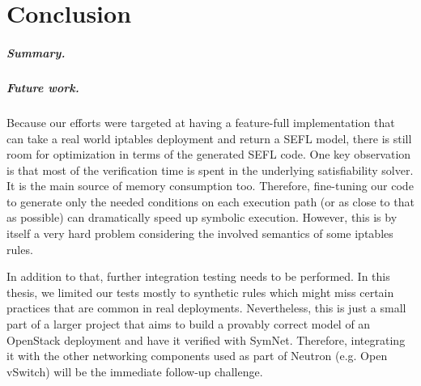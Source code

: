 \chapter{Conclusion}

\paragraph{Summary.}

\paragraph{Future work.}
Because our efforts were targeted at having a feature-full implementation that
can take a real world iptables deployment and return a SEFL model, there is
still room for optimization in terms of the generated SEFL code.  One key
observation is that most of the verification time is spent in the underlying
satisfiability solver.  It is the main source of memory consumption too.
Therefore, fine-tuning our code to generate only the needed conditions on each
execution path (or as close to that as possible) can dramatically speed up
symbolic execution.  However, this is by itself a very hard problem considering
the involved semantics of some iptables rules.

In addition to that, further integration testing needs to be performed.  In
this thesis, we limited our tests mostly to synthetic rules which might miss
certain practices that are common in real deployments.  Nevertheless, this is
just a small part of a larger project that aims to build a provably correct
model of an OpenStack deployment and have it verified with SymNet.  Therefore,
integrating it with the other networking components used as part of Neutron
(e.g. Open vSwitch) will be the immediate follow-up challenge.
